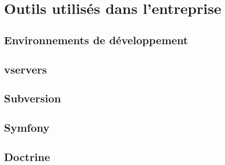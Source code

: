 \section{Outils utilisés dans l'entreprise}

\subsection{Environnements de développement}

\subsection{vservers}

\subsection{Subversion}


\subsection{Symfony}

\subsection{Doctrine}
